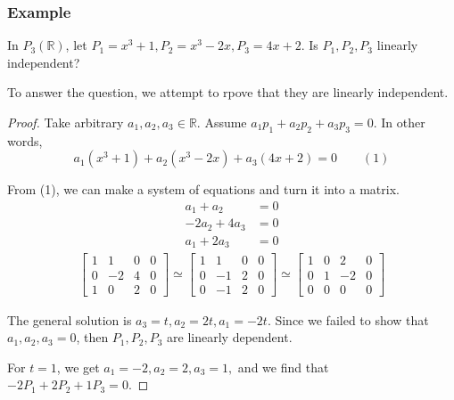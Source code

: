 \documentclass[11pt]{article}
\begin{document}
    \subsubsection{Example}

    In \(P_3(\mathbb{R})\), let \(P_1 = x^3 + 1, P_2 = x^3 - 2x, P_3 = 4x + 2.\) Is \(P_1, P_2, P_3\) linearly independent?

    To answer the question, we attempt to rpove that they are linearly independent.

    \begin{proof}
        Take arbitrary \(a_1, a_2, a_3 \in \mathbb{R}\). Assume \(a_1 p_1 + a_2 p_2 + a_3 p_3 = 0.\) In other words, \[a_1 (x^3 + 1) + a_2 (x^3 - 2x) + a_3 (4x + 2) = 0 \qquad (1)\] 

        From (1), we can make a system of equations and turn it into a matrix.
        \begin{align*}
            a_1 + a_2    &= 0 \\
            -2a_2 + 4a_3 &= 0 \\
            a_1 + 2 a_3  &= 0
        \end{align*}
        \begin{align*}
            \begin{bmatrix}
                1 & 1  & 0 & 0 \\
                0 & -2 & 4 & 0 \\
                1 & 0  & 2 & 0
            \end{bmatrix} \simeq \begin{bmatrix}
                                    1 & 1  & 0 & 0 \\
                                    0 & -1 & 2 & 0 \\
                                    0 & -1 & 2 & 0 
                                \end{bmatrix} \simeq \begin{bmatrix}
                                    1 & 0 & 2  & 0 \\
                                    0 & 1 & -2 & 0 \\
                                    0 & 0 & 0  & 0
                                \end{bmatrix}
        \end{align*}

        The general solution is \(a_3 = t, a_2 = 2t, a_1 = -2t\). Since we failed to show that \(a_1, a_2, a_3 = 0\), then \(P_1, P_2, P_3\) are linearly dependent. 

        For \(t = 1\), we get \(a_1 = -2, a_2 = 2, a_3 = 1, \) and we find that \(-2P_1 + 2P_2 + 1 P_3 = 0.\)
    \end{proof}
\end{document}
